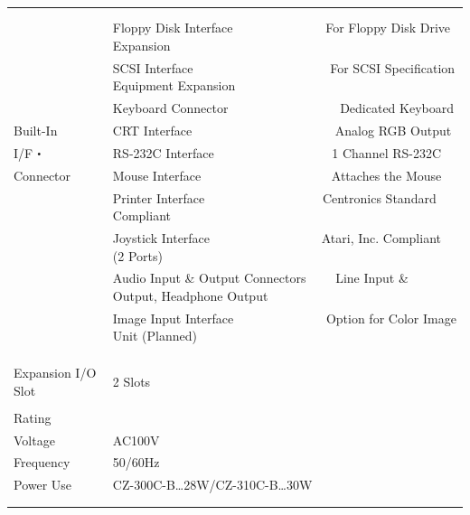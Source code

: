 ﻿\documentclass[twoside,a4paper,12pt]{article}
\begin{document}
\begin{tabular}{|p{17mm}|p{13mm}|p{23mm}|p{80mm}|p{30mm}|}
& \multicolumn{4}{l|}{}\\
\cline{2-5}
& \multicolumn{4}{l|}{}\\[-3mm]
& \multicolumn{4}{l|}{Floppy Disk Interface \ \ \ \ \ \ \ \ \ \ \ \ \ \ For Floppy Disk Drive Expansion}\\[2mm]
& \multicolumn{4}{l|}{SCSI Interface \ \ \ \ \ \ \ \ \ \ \ \ \ \ \ \ \ \ \ \ \ For SCSI Specification Equipment Expansion}\\[2mm]
& \multicolumn{4}{l|}{Keyboard Connector \ \ \ \ \ \ \ \ \ \ \ \ \ \ \ \ \ Dedicated Keyboard}\\
Built-In & \multicolumn{4}{l|}{CRT Interface \ \ \ \ \ \ \ \ \ \ \ \ \ \ \ \ \ \ \ \ \ \ Analog RGB Output}\\
I/F・ & \multicolumn{4}{l|}{RS-232C Interface \ \ \ \ \ \ \ \ \ \ \ \ \ \ \ \ \ \ 1 Channel RS-232C}\\
Connector & \multicolumn{4}{l|}{Mouse Interface \ \ \ \ \ \ \ \ \ \ \ \ \ \ \ \ \ \ \ \ Attaches the Mouse}\\
& \multicolumn{4}{l|}{Printer Interface \ \ \ \ \ \ \ \ \ \ \ \ \ \ \ \ \ \ Centronics Standard Compliant}\\
& \multicolumn{4}{l|}{Joystick Interface \ \ \ \ \ \ \ \ \ \ \ \ \ \ \ \ \ Atari, Inc. Compliant (2 Ports)}\\
& \multicolumn{4}{l|}{Audio Input \& Output Connectors \ \ \ \ Line Input \& Output, Headphone Output}\\
& \multicolumn{4}{l|}{Image Input Interface \ \ \ \ \ \ \ \ \ \ \ \ \ \ Option for Color Image Unit (Planned)}\\
& \multicolumn{4}{l|}{}\\
& \multicolumn{4}{l|}{}\\
\hline
\multicolumn{3}{|l|}{} & \multicolumn{2}{l|}{}\\[-3mm]
\multicolumn{3}{|l|}{Expansion I/O Slot} & \multicolumn{2}{l|}{2 Slots}\\
\hline
& \multicolumn{4}{l|}{}\\[-3mm]
Rating & \multicolumn{4}{l|}{}\\
Voltage & \multicolumn{4}{l|}{AC100V}\\
Frequency & \multicolumn{4}{l|}{50/60Hz}\\
Power Use & \multicolumn{4}{l|}{CZ-300C-B…28W/CZ-310C-B…30W}\\
& \multicolumn{4}{l|}{}\\
& \multicolumn{4}{l|}{}\\
\hline
\end{tabular}
\end{document}
